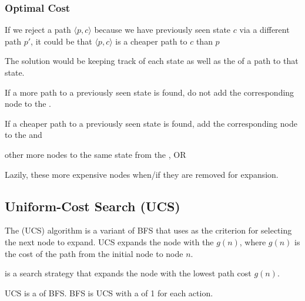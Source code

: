 \subsubsection{Optimal Cost}

If we reject a path $\langle p, c \rangle$ because we have previously seen state $c$ via a different path $p'$, it could be that $\langle p, c \rangle$ is a cheaper path to $c$ than $p$

The solution would be keeping track of each state as well as the  of a path to that state.

\begin{listu}
    \item If a more  path to a previously seen state is found, do not add the corresponding node to the \Frontier.
    \item If a cheaper path to a previously seen state is found, add the corresponding node to the \Frontier and
    \begin{listu}
        \item {} other more  nodes to the same state from the \Frontier, OR
        \item Lazily,  these more expensive nodes when/if they are removed for expansion.
    \end{listu}
\end{listu}

\subsection{Uniform-Cost Search (UCS)}

The  (UCS) algorithm is a variant of BFS that uses  as the criterion for selecting the next node to expand. UCS expands the node with the  $g(n)$, where $g(n)$ is the cost of the path from the initial node to node $n$.

\begin{definition}\label{def:ucs}
     is a search strategy that expands the node with the lowest path cost $g(n)$.
\end{definition}

\begin{remark}
    UCS is a  of BFS. BFS is UCS with a  of 1 for each action.
\end{remark}

